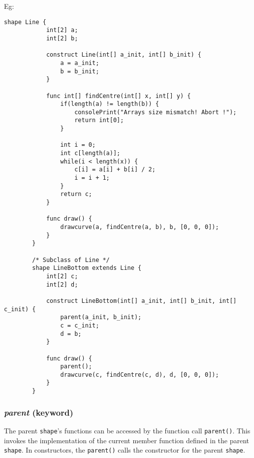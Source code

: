 \documentclass[letterpaper,12pt]{article}
\begin{document}
Eg: \begin{lstlisting}[aboveskip=-13pt]
        shape Line {
            int[2] a;
            int[2] b;
            
            construct Line(int[] a_init, int[] b_init) {
                a = a_init;
                b = b_init;
            }
    
            func int[] findCentre(int[] x, int[] y) {
                if(length(a) != length(b)) {
                    consolePrint("Arrays size mismatch! Abort !");
                    return int[0];
                }
        
                int i = 0;
                int c[length(a)];
                while(i < length(x)) {
                    c[i] = a[i] + b[i] / 2;
                    i = i + 1;
                }
                return c;
            }
            
            func draw() {
                drawcurve(a, findCentre(a, b), b, [0, 0, 0]);
            }
        }

        /* Subclass of Line */
        shape LineBottom extends Line {
            int[2] c;
            int[2] d;
    
            construct LineBottom(int[] a_init, int[] b_init, int[] c_init) {
                parent(a_init, b_init);
                c = c_init;
                d = b;
            }
    
            func draw() {
                parent();
                drawcurve(c, findCentre(c, d), d, [0, 0, 0]);
            }
        }
    \end{lstlisting}

    \subsubsection{\textit{parent} (keyword)}
    The parent \texttt{shape}'s functions can be accessed by the function call \texttt{parent()}. This invokes the implementation of the current member function defined in the parent \texttt{shape}. In constructors, the \texttt{parent()} calls the constructor for the parent \texttt{shape}.
\end{document}
